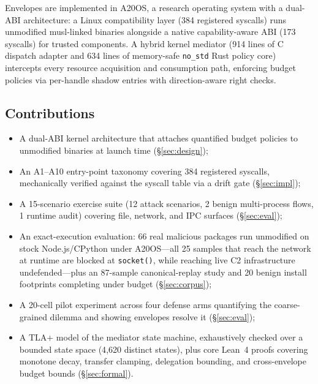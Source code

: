 \documentclass[letterpaper,twocolumn,10pt]{article}
\begin{document}
Envelopes are implemented in A20OS, a research operating system with a
dual-ABI architecture: a Linux compatibility layer (384 registered
syscalls) runs unmodified musl-linked binaries alongside a native
capability-aware ABI (173 syscalls) for trusted components.  A hybrid
kernel mediator (914 lines of C dispatch adapter and 634 lines of
memory-safe \texttt{no\_std} Rust policy core) intercepts every resource
acquisition and consumption path, enforcing budget policies via
per-handle shadow entries with direction-aware right checks.

\subsection{Contributions}

\begin{itemize}
\item A dual-ABI kernel architecture that attaches quantified budget
      policies to unmodified binaries at launch time (\S\ref{sec:design});
\item An A1--A10 entry-point taxonomy covering 384 registered syscalls,
      mechanically verified against the syscall table via a drift gate
      (\S\ref{sec:impl});
\item A 15-scenario exercise suite (12 attack scenarios, 2 benign
      multi-process flows, 1 runtime audit) covering file, network,
      and IPC surfaces (\S\ref{sec:eval});
\item An exact-execution evaluation: 66 real malicious packages run
      unmodified on stock Node.js/CPython under A20OS---all 25 samples
      that reach the network at runtime are blocked at
      \texttt{socket()}, while reaching live C2 infrastructure
      undefended---plus an 87-sample canonical-replay study and 20
      benign install footprints completing under budget
      (\S\ref{sec:corpus});
\item A 20-cell pilot experiment across four defense arms quantifying
      the coarse-grained dilemma and showing envelopes resolve it
      (\S\ref{sec:eval});
\item A TLA+ model of the mediator state machine, exhaustively checked
      over a bounded state space (4{,}620 distinct states), plus core
      Lean~4 proofs covering monotone decay, transfer clamping, delegation bounding, and cross-envelope budget bounds
      (\S\ref{sec:formal}).
\end{itemize}

\end{document}
